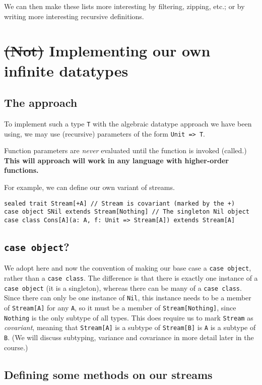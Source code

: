 \documentclass[11pt]{article}
\begin{document}
We can then make these lists more interesting
by filtering, zipping, etc.;
or by writing more interesting recursive definitions.

\section{\sout{(Not)} Implementing our own infinite datatypes}
\label{sec:org37017d7}
\subsection{The approach}
\label{sec:org300c87d}

To implement such a type \texttt{T} with the algebraic datatype approach
we have been using, we may use (recursive) parameters
of the form \texttt{Unit => T}.

Function parameters are \emph{never} evaluated until
the function is invoked (called.)
\textbf{This will approach will work in any language with
higher-order functions.}

For example, we can define our own variant of streams.
\begin{verbatim}
sealed trait Stream[+A] // Stream is covariant (marked by the +)
case object SNil extends Stream[Nothing] // The singleton Nil object
case class Cons[A](a: A, f: Unit => Stream[A]) extends Stream[A]
\end{verbatim}

\subsection{\texttt{case object}?}
\label{sec:orge4f0d42}

We adopt here and now the convention of making our base case
a \texttt{case object}, rather than a \texttt{case class}.
The difference is that there is exactly one instance of
a \texttt{case object} (it is a singleton),
whereas there can be many of a \texttt{case class}.
Since there can only be one instance of \texttt{Nil},
this instance needs to be a member of \texttt{Stream[A]} for any \texttt{A},
so it must be a member of \texttt{Stream[Nothing]}, since \texttt{Nothing} is
the only subtype of all types.
This does require us to mark \texttt{Stream} as \emph{covariant},
meaning that \texttt{Stream[A]} is a subtype of \texttt{Stream[B]} is \texttt{A} is a subtype of \texttt{B}.
(We will discuss subtyping, variance and covariance
in more detail later in the course.)

\subsection{Defining some methods on our streams}
\label{sec:orgca97ba6}
\end{document}
